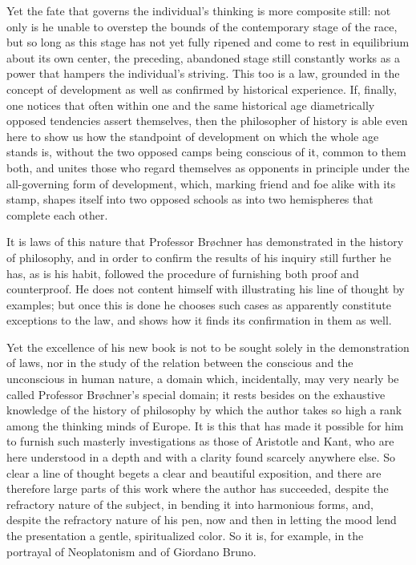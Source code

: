 \documentclass[12pt,a4paper,openany]{book}
\newcommand{\opage}[1]{\marginnote{\footnotesize\textit{[#1]}}}
\begin{document}
\opage{119}Yet the fate that governs the individual's thinking is more
composite still: not only is he unable to overstep the bounds of
the contemporary stage of the race, but so long as this stage has
not yet fully ripened and come to rest in equilibrium about its
own center, the preceding, abandoned stage still constantly works
as a power that hampers the individual's striving. This too is a
law, grounded in the concept of development as well as confirmed
by historical experience. If, finally, one notices that often
within one and the same historical age diametrically opposed
tendencies assert themselves, then the philosopher of history is
able even here to show us how the standpoint of development on
which the whole age stands is, without the two opposed camps being
conscious of it, common to them both, and unites those who regard
themselves as opponents in principle under the all-governing form
of development, which, marking friend and foe alike with its
stamp, shapes itself into two opposed schools as into two
hemispheres that complete each other.

It is laws of this nature that Professor Brøchner has
demonstrated in the history of philosophy, and in order to confirm
the results of his inquiry still further he has, as is his habit,
followed the procedure of furnishing both proof and counterproof.
He does not content himself with illustrating his line of thought
by examples; but once this is done he chooses such cases as
apparently constitute exceptions to the law, and shows how it
finds its confirmation in them as well.

Yet the excellence of his new book is not to be sought solely
in the demonstration of laws, nor in the study of the relation
between the conscious and the unconscious in human nature, a
domain which, incidentally, may very nearly be called Professor
Brøchner's special domain; it rests besides on the exhaustive
knowledge of the history of philosophy by which the author takes
so high a rank among the thinking minds of Europe. It is this that
has made it possible for him to furnish such masterly
investigations as those of Aristotle and Kant, who are here
understood in a depth and with a clarity found scarcely anywhere
else. So clear a line of thought begets a clear and beautiful
exposition, and there are therefore large parts of this work where
the author has succeeded, despite the refractory nature of the
subject, in bending it into harmonious forms, and, despite the
refractory nature of his pen, now and then in
\opage{120}letting the mood lend the presentation a gentle, spiritualized
color. So it is, for example, in the portrayal of Neoplatonism and
of Giordano Bruno.
\end{document}
